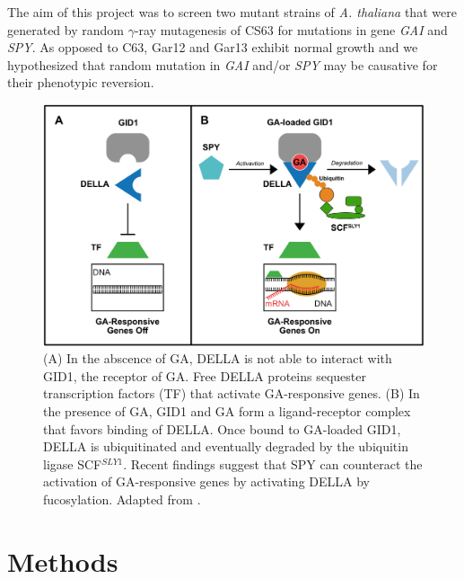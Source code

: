 \documentclass[10pt,a4paper]{article}
\begin{document}


\noindent The aim of this project was to screen two mutant strains of \textit{A. thaliana} that were generated by random $\gamma$-ray mutagenesis of CS63 for mutations in gene \textit{GAI} and \textit{SPY}. As opposed to C63, Gar12 and Gar13 exhibit normal growth and we hypothesized that random mutation in \textit{GAI} and/or \textit{SPY} may be causative for their phenotypic reversion.\\


\begin{figure}[h]
	\centering
	\includegraphics[width=0.6\linewidth]{img/GAI_SPY_Introcut}
	\caption[GAI and SPY pathways]{ (A) In the abscence of GA, DELLA is not able to interact with GID1, the receptor of GA. Free DELLA proteins sequester transcription factors (TF) that activate GA-responsive genes. (B) In the presence of GA, GID1 and GA form a ligand-receptor complex that favors binding of DELLA. Once bound to GA-loaded GID1, DELLA is ubiquitinated and eventually degraded by the ubiquitin ligase SCF$^{SLY1}$. Recent findings suggest that SPY can counteract the activation of GA-responsive genes by activating DELLA by fucosylation. Adapted from \cite{hauvermale_gibberellin_2012}.}
	\label{fig:gaspypathway}
\end{figure}




\section*{\large Methods} 
\end{document}
